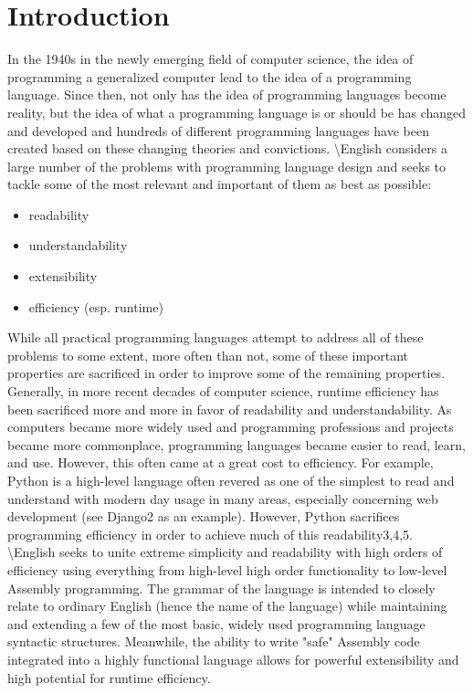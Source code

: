 \documentclass{article}
\title{\name{}}
\date{2015-08-28}
\author{Connor Davey}
\newcommand{\name}{\textbackslash{}English}
\begin{document}
\maketitle
\newpage
	
\tableofcontents
\newpage

\section{Introduction}
In the 1940s in the newly emerging field of computer science, the idea of programming a generalized computer lead to the idea of a programming language. Since then, not only has the idea of programming languages become reality, but the idea of what a programming language is or should be has changed and developed and hundreds of different programming languages have been created based on these changing theories and convictions.
\name{} considers a large number of the problems with programming language design and seeks to tackle some of the most relevant and important of them as best as possible:
	\begin{multicols}{2}
	\begin{itemize}
		\item readability
		\item understandability
		\item extensibility
		\item efficiency (esp. runtime)
	\end{itemize}
	\end{multicols}
\indent While all practical programming languages attempt to address all of these problems to some extent, more often than not, some of these important properties are sacrificed in order to improve some of the remaining properties. Generally, in more recent decades of computer science, runtime efficiency has been sacrificed more and more in favor of readability and understandability. As computers became more widely used and programming professions and projects became more commonplace, programming languages became easier to read, learn, and use. However, this often came at a great cost to efficiency. For example, Python is a high-level language often revered as one of the simplest to read and understand\cite{Sanner99} with modern day usage in many areas, especially concerning web development (see Django2 as an example). However, Python sacrifices programming efficiency in order to achieve much of this readability3,4,5.\\
\indent \name{} seeks to unite extreme simplicity and readability with high orders of efficiency using everything from high-level high order functionality to low-level Assembly programming. The grammar of the language is intended to closely relate to ordinary English (hence the name of the language) while maintaining and extending a few of the most basic, widely used programming language syntactic structures. Meanwhile, the ability to write "safe" Assembly code integrated into a highly functional language allows for powerful extensibility and high potential for runtime efficiency.
	
\end{document}
